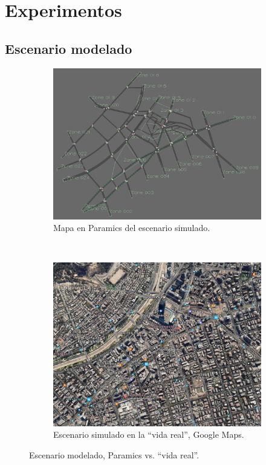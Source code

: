 \section{Experimentos}\label{sec:experiments}
\subsection{Escenario modelado}

\begin{figure}[tpb]
    \centering
    \begin{subfigure}{0.8\textwidth}
        \centering
        \includegraphics[width=\linewidth]{figuras/costanera.png}
        \caption{Mapa en Paramics del escenario simulado.}
    \end{subfigure}\\
    \begin{subfigure}{0.8\textwidth}
        \centering
        \includegraphics[width=\linewidth]{figuras/costanera_maps.png}
        \caption{Escenario simulado en la ``vida real'', Google Maps.}
    \end{subfigure}
    \caption{Escenario modelado, Paramics vs. ``vida real''.}
    \label{fig:costanera}
\end{figure}

